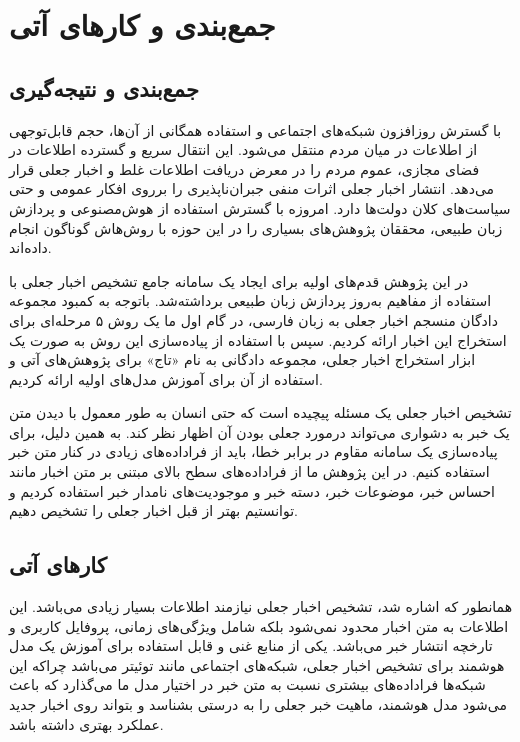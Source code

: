 \chapter{جمع‌بندی و کارهای آتی}
\section{جمع‌بندی و نتیجه‌گیری}
با گسترش روزافزون شبکه‌های اجتماعی و استفاده همگانی از آن‌ها، حجم قابل‌توجهی از اطلاعات در میان مردم منتقل می‌شود. این انتقال سریع و گسترده اطلاعات در فضای مجازی، عموم مردم را در معرض دریافت اطلاعات غلط و اخبار جعلی قرار می‌دهد. انتشار اخبار جعلی اثرات منفی جبران‌ناپذیری را برروی افکار عمومی و حتی سیاست‌های کلان دولت‌ها دارد. امروزه با گسترش استفاده از هوش‌مصنوعی و پردازش زبان طبیعی، محققان پژوهش‌های بسیاری را در این حوزه با روش‌هاش گوناگون انجام داده‌اند.

در این پژوهش قدم‌های اولیه برای ایجاد یک سامانه جامع تشخیص اخبار جعلی با استفاده از مفاهیم به‌روز پردازش زبان طبیعی برداشته‌شد. باتوجه به کمبود مجموعه دادگان منسجم اخبار جعلی به زبان فارسی، در گام اول ما یک روش ۵ مرحله‌ای برای استخراج این اخبار ارائه کردیم. سپس با استفاده از پیاده‌سازی این روش به صورت یک ابزار استخراج اخبار جعلی، مجموعه‌ دادگانی به نام «تاج» برای پژوهش‌های آتی و استفاده از آن برای آموزش مدل‌های اولیه ارائه کردیم.

تشخیص اخبار جعلی یک مسئله پیچیده است که حتی انسان به طور معمول با دیدن متن یک خبر به دشواری می‌تواند درمورد جعلی بودن آن اظهار نظر کند. به همین دلیل، برای پیاده‌سازی یک سامانه مقاوم در برابر خطا، باید از فراداده‌های زیادی در کنار متن خبر استفاده کنیم. در این پژوهش ما از فراداده‌های سطح بالای مبتنی بر متن اخبار مانند احساس خبر، موضوعات خبر، دسته خبر و موجودیت‌های نامدار خبر استفاده کردیم و توانستیم بهتر از قبل اخبار جعلی را تشخیص دهیم.

\section{کار‌های آتی}
همانطور که اشاره شد، تشخیص اخبار جعلی نیازمند اطلاعات بسیار زیادی می‌باشد. این اطلاعات به متن اخبار محدود نمی‌شود بلکه شامل ویژگی‌های زمانی، پروفایل کاربری و تارخچه انتشار خبر می‌باشد. یکی از منابع غنی و قابل استفاده برای آموزش یک مدل هوشمند برای تشخیص اخبار جعلی، شبکه‌‌های اجتماعی مانند توئیتر می‌باشد چراکه این شبکه‌ها فراداده‌های بیشتری نسبت به متن خبر در اختیار مدل ما می‌گذارد که باعث می‌شود مدل هوشمند، ماهیت خبر جعلی را به درستی بشناسد و بتواند روی اخبار جدید عملکرد بهتری داشته باشد.